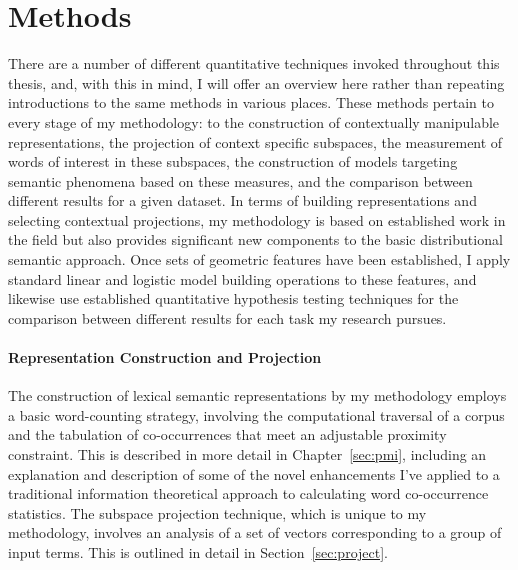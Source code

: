 \section{Methods} \label{sec:methods}
There are a number of different quantitative techniques invoked throughout this thesis, and, with this in mind, I will offer an overview here rather than repeating introductions to the same methods in various places.  These methods pertain to every stage of my methodology: to the construction of contextually manipulable representations, the projection of context specific subspaces, the measurement of words of interest in these subspaces, the construction of models targeting semantic phenomena based on these measures, and the comparison between different results for a given dataset.  In terms of building representations and selecting contextual projections, my methodology is based on established work in the field but also provides significant new components to the basic distributional semantic approach.  Once sets of geometric features have been established, I apply standard linear and logistic model building operations to these features, and likewise use established quantitative hypothesis testing techniques for the comparison between different results for each task my research pursues.

\paragraph{Representation Construction and Projection} The construction of lexical semantic representations by my methodology employs a basic word-counting strategy, involving the computational traversal of a corpus and the tabulation of co-occurrences that meet an adjustable proximity constraint.  This is described in more detail in Chapter~\ref{sec:pmi}, including an explanation and description of some of the novel enhancements I've applied to a traditional information theoretical approach to calculating word co-occurrence statistics.  The subspace projection technique, which is unique to my methodology, involves an analysis of a set of vectors corresponding to a group of input terms.  This is outlined in detail in Section~\ref{sec:project}.

